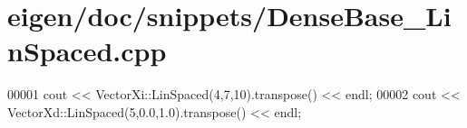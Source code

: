 \hypertarget{eigen_2doc_2snippets_2_dense_base___lin_spaced_8cpp_source}{}\section{eigen/doc/snippets/\+Dense\+Base\+\_\+\+Lin\+Spaced.cpp}
\label{eigen_2doc_2snippets_2_dense_base___lin_spaced_8cpp_source}

\begin{DoxyCode}
00001 cout << VectorXi::LinSpaced(4,7,10).transpose() << endl;
00002 cout << VectorXd::LinSpaced(5,0.0,1.0).transpose() << endl;
\end{DoxyCode}
